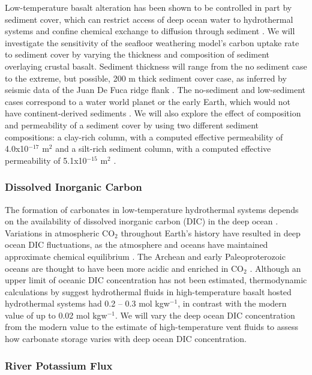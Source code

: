 \documentclass[authoryear,round,12pt]{article}
\begin{document}
Low-temperature basalt alteration has been shown to be controlled in
part by sediment cover, which can restrict access of deep ocean water
to hydrothermal systems and confine chemical exchange to diffusion
through sediment \citep{wheat2000, alt1999, snelgrove1996}. We will
investigate the sensitivity of the seafloor weathering model's carbon
uptake rate to sediment cover by varying the thickness and composition
of sediment overlaying crustal basalt. Sediment thickness will range
from  the no sediment case to the extreme, but possible, 200 m
thick sediment cover case, as inferred by seismic data of the Juan De
Fuca ridge flank \citep{rohr1994}. The no-sediment and low-sediment
cases correspond to a water world planet or the early Earth, which
would not have continent-derived sediments \citep{eriksson2007,
  romans2013}. We will also explore the effect of composition and
permeability of a sediment cover by using two different sediment
compositions: a clay-rich column, with a computed effective
permeability of 4.0x10$^{-17}$ m$^2$ and a silt-rich sediment column,
with a computed effective permeability of 5.1x10$^{-15}$ m$^2$
\citep{snelgrove1996}.

\subsubsection{Dissolved Inorganic Carbon}

The formation of carbonates in low-temperature hydrothermal systems
depends on the availability of dissolved inorganic carbon (DIC) in the
deep ocean \citep{sleep2001, alt1999}. Variations in atmospheric
CO$_2$ throughout Earth's history have resulted in deep ocean DIC
fluctuations, as the atmosphere and oceans have maintained approximate
chemical equilibrium \citep{berner1983, grotzinger1993,
  berner2001}.  The Archean and early Paleoproterozoic
oceans are thought to have been more acidic and enriched in CO$_2$
\citep{grotzinger1993}. Although an upper limit of oceanic DIC
concentration has not been estimated, thermodynamic calculations by
\citet{shibuya2010} suggest hydrothermal fluids in high-temperature
basalt hosted hydrothermal systems had 0.2 -- 0.3 mol kgw$^{-1}$, in
contrast with the modern value of up to 0.02 mol kgw$^{-1}$. We will
vary the deep ocean DIC concentration from the modern value to the
estimate of high-temperature vent fluids to assess how carbonate
storage varies with deep ocean DIC concentration.

\subsubsection{River Potassium Flux}
\end{document}
